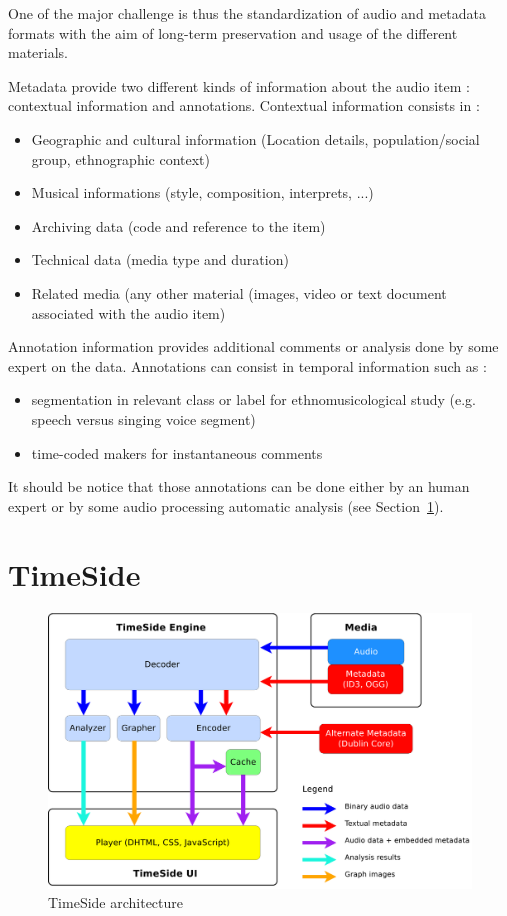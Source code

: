 \documentclass[runningheads,a4paper]{llncs}
\begin{document}
One of the major challenge is thus the standardization of audio and metadata formats with the aim of long-term preservation and usage of the different materials. 

Metadata provide two different kinds of information about the audio item : contextual information and annotations.
Contextual information consists in :
\begin{itemize}
\item Geographic and cultural information  (Location details, population/social group, ethnographic context)
\item Musical informations (style, composition, interprets, ...)
\item Archiving data (code and reference to the item)
\item Technical data (media type and duration)
\item Related media (any other material (images, video or text document associated with the audio item)
\end{itemize}

Annotation information provides additional comments or analysis done by some expert on the data. Annotations can consist in temporal information such as :
\begin{itemize}
\item segmentation in relevant class or label for ethnomusicological study (e.g. speech versus singing voice segment)
\item time-coded makers for instantaneous comments 
\end{itemize}
It should be notice that those annotations can be done either by an human expert or by some audio processing automatic analysis (see Section~\ref{sec:Timeside}).


\section{TimeSide}\label{sec:Timeside}

\begin{figure}[htbp]
  \centering
  \includegraphics[width=12cm]{img/timeside_schema.pdf}
  \caption{TimeSide architecture}
\end{figure}
\end{document}
